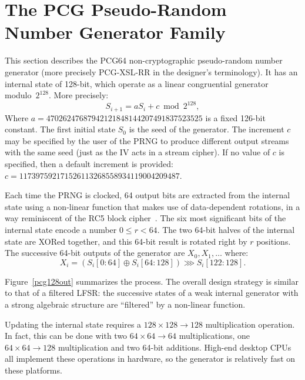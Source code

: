 \documentclass[preprint,svgnames]{iacrtrans}
\begin{document}
\section{The PCG Pseudo-Random Number Generator Family}

This section describes the \textsf{PCG64} non-cryptographic pseudo-random number
generator (more precisely \textsf{PCG-XSL-RR} in the designer's terminology). It
has an internal state of 128-bit, which operate as a linear congruential
generator modulo~$2^{128}$. More precisely:
\[
  S_{i+1} = a S_i + c \bmod 2^{128},
\]
Where $a = 47026247687942121848144207491837523525$ is a fixed 126-bit
constant. The first initial state $S_0$ is the seed of the generator. The
increment $c$ may be specified by the user of the PRNG to produce different
output streams with the same seed (just as the IV acts in a stream cipher). If
no value of $c$ is specified, then a default increment is provided:
$c = 117397592171526113268558934119004209487$.

Each time the PRNG is clocked, 64 output bits are extracted from the internal
state using a non-linear function that makes use of data-dependent rotations, in
a way reminiscent of the \textsf{RC5} block cipher~\cite{Rivest94}. The six most
significant bits of the internal state encode a number $0 \leq r < 64$. The two
64-bit halves of the internal state are XORed together, and this 64-bit result
is rotated right by $r$ positions. The successive 64-bit outputs of the
generator are $X_0, X_1, \dots$ where:
\begin{equation}\label{eq:output}
  X_i =(S_i[0:64] \oplus S_i[64:128]) \ggg S_i[122:128].
\end{equation}

Figure~\ref{pcg128out} summarizes the process. The overall design strategy is
similar to that of a filtered LFSR: the successive states of a weak internal
generator with a strong algebraic structure are ``filtered'' by a non-linear
function.

Updating the internal state requires a $128 \times 128 \rightarrow 128$
multiplication operation. In fact, this can be done with two
$64 \times 64 \rightarrow 64$ multiplications, one
$64 \times 64 \rightarrow 128$ multiplication and two 64-bit additions. High-end
desktop CPUs all implement these operations in hardware, so the generator is
relatively fast on these platforms.
\end{document}
